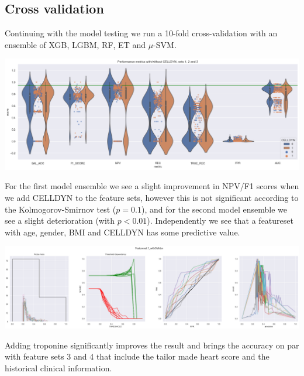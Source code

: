 \documentclass[a4paper,10pt]{article}
\begin{document}
\subsection{Cross validation}
%
Continuing with the model testing we run a 10-fold cross-validation with an ensemble of XGB, LGBM, RF, ET and $\mu$-SVM.
\begin{center}
 \includegraphics[bb=0 0 1175 442,scale=0.3]{images/violin_ensemble_1.png}
\end{center}
%
For the first model ensemble we see a slight improvement in NPV/F1 scores when we add CELLDYN to the feature sets, however this is not significant according to the Kolmogorov-Smirnov test ($p=0.1$), and for the second model ensemble we see a slight deterioration (with $p<0.01$).
%
Independently we see that a featureset with age, gender, BMI and CELLDYN has some predictive value.
\begin{center}
 \includegraphics[bb=0 0 1710 478,scale=0.2,keepaspectratio=true]{images/metric_plots_set1_ensemble_1.png}
\end{center}
%
Adding troponine significantly improves the result and brings the accuracy on par with feature sets 3 and 4 that include the tailor made heart score and the historical clinical information.
\end{document}
